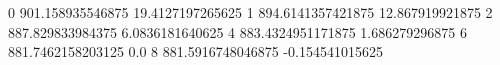 0 901.158935546875 19.4127197265625
1 894.6141357421875 12.867919921875
2 887.829833984375 6.0836181640625
4 883.4324951171875 1.686279296875
6 881.7462158203125 0.0
8 881.5916748046875 -0.154541015625
